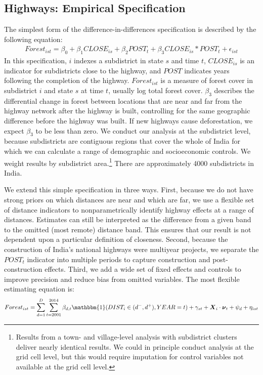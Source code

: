 \subsection{Highways: Empirical Specification}
\label{sec:highway_spec}

The simplest form of the difference-in-differences specification is
described by the following equation:
%
\begin{align} 
\label{eq:gq_simple} 
Forest_{ist} = \beta_0 + \beta_1 CLOSE_{is} + \beta_2 POST_{t}
+ \beta_3 CLOSE_{is} * POST_{t} + \epsilon_{ist}
\end{align}
%
In this specification, $i$ indexes a subdistrict in state $s$ and time
$t$, $CLOSE_{is}$ is an indicator for subdistricts close to the
highway, and $POST$ indicates years following the completion of the
highway. $Forest_{ist}$ is a measure of forest cover in subdistrict
$i$ and state $s$ at time $t$, usually log total forest cover. $\beta_3$
describes the differential change in forest between locations that are
near and far from the highway network after the highway is built,
controlling for the same geographic difference before the highway was
built. If new highways cause deforestation, we expect $\beta_3$ to be
less than zero. We conduct our analysis at the subdistrict level,
because subdistricts are contiguous regions that cover the whole of
India for which we can calculate a range of demographic and
socioeconomic controls. We weight results by subdistrict
area.\footnote{Results from a town- and village-level analysis with
  subdistrict clusters deliver nearly identical results. We could in
  principle conduct analysis at the grid cell level, but this would
  require imputation for control variables not available at the grid
  cell level.} There are approximately 4000 subdistricts in India.

We extend this simple specification in three ways. First, because we
do not have strong priors on which distances are near and which are
far, we use a flexible set of distance indicators to nonparametrically
identify highway effects at a range of distances. Estimates can still
be interpreted as the difference from a given band to the omitted
(most remote) distance band. This ensures that our result is not
dependent upon a particular definition of closeness. Second, because
the construction of India's national highways were multiyear projects,
we separate the $POST_t$ indicator into multiple periods to capture
construction and post-construction effects. Third, we add a wide set
of fixed effects and controls to improve precision and reduce bias
from omitted variables. The most flexible estimating equation is:
%
\begin{align} 
\label{eq:gq} 
  Forest_{ist} = \sum_{d =
  1}^D \sum_{t=2001}^{2014} \beta_{d,t} \mathbbm{1}
  (DIST_i \in (d^-,d^+), YEAR=t) + 
  \gamma_{st} + \boldsymbol X_i \cdot \boldsymbol \nu_{t} +
  \psi_d + \eta_{ist} \end{align}

